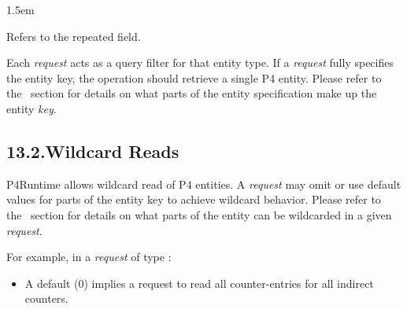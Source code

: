 \documentclass[11pt]{article}
\begin{document}
{\begin{mddefinitions}

\begin{mdbmarginx}{}{}{}{1.5em}%
\begin{mddefdata}%
Refers to the  repeated field.%
\end{mddefdata}%
\end{mdbmarginx}%
\end{mddefinitions}%

\noindent{}Each \emph{request} acts as a query filter for that entity type. If a \emph{request} fully
specifies the entity key, the  operation should retrieve a single P4
entity.  Please refer to the~ section
for details on what parts of the entity specification make up the entity \emph{key}.%

\subsection{13.2.\hspace*{0.5em}Wildcard Reads}\label{sec-wildcard-reads}%

\noindent{}P4Runtime allows wildcard read of P4 entities. A \emph{request} may omit or use
default values for parts of the entity key to achieve wildcard behavior. Please
refer to the~ section for details on
what parts of the entity can be wildcarded in a given \emph{request}.%

For example, in a \emph{request} of type :%

\begin{itemize}[noitemsep,topsep=\mdcompacttopsep]%

\item{}A default  (0) implies a request to read all counter-entries for
all indirect counters.%


\end{itemize}}
\end{document}
